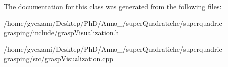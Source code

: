 The documentation for this class was generated from the following files\+:\begin{DoxyCompactItemize}
\item 
/home/gvezzani/\+Desktop/\+Ph\+D/\+Anno\+\_/super\+Quadratiche/superquadric-\/grasping/include/grasp\+Visualization.\+h\item 
/home/gvezzani/\+Desktop/\+Ph\+D/\+Anno\+\_/super\+Quadratiche/superquadric-\/grasping/src/grasp\+Visualization.\+cpp\end{DoxyCompactItemize}
